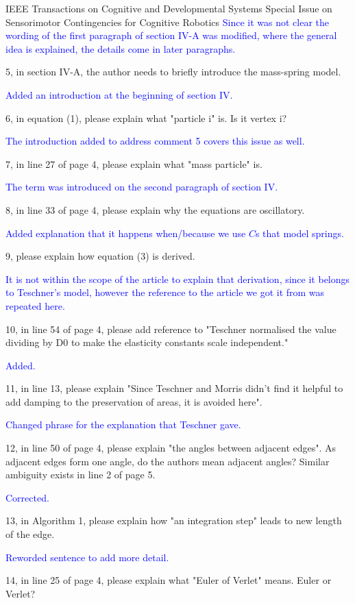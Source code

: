 \documentclass[a4paper,12pt]{letter}
\newcommand{\comment}[1]{\textcolor{blue}{#1}}
\begin{document}
\begin{letter}{IEEE Transactions on Cognitive and Developmental Systems\newline
Special Issue on Sensorimotor Contingencies for Cognitive Robotics}
\comment{Since it was not clear the wording of the first paragraph of section IV-A was modified, where the general idea is explained, the details come in later paragraphs.}

5, in section IV-A, the author needs to briefly introduce the mass-spring model.

\comment{Added an introduction at the beginning of section IV.}

6, in equation (1), please explain what "particle i" is. Is it vertex i? 

\comment{The introduction added to address comment 5 covers this issue as well.}

7, in line 27 of page 4, please explain what "mass particle" is.

\comment{The term was introduced on the second paragraph of section IV.}

8, in line 33 of page 4, please explain why the equations are oscillatory.

\comment{Added explanation that it happens when/because we use $C$s that model springs.}

9, please explain how equation (3) is derived.

\comment{It is not within the scope of the article to explain that derivation, since it belongs to Teschner's model, however the reference to the article we got it from was repeated here.}

10, in line 54 of page 4, please add reference to "Teschner normalised the value dividing by D0 to make the elasticity constants scale independent." 

\comment{Added.}

11, in line 13, please explain "Since Teschner and Morris didn’t find it helpful to add damping to the preservation of areas, it is avoided here".

\comment{Changed phrase for the explanation that Teschner gave.}

12, in line 50 of page 4, please explain "the angles between adjacent edges". As adjacent edges form one angle, do the authors mean adjacent angles? Similar ambiguity exists in line 2 of page 5. 

\comment{Corrected.}

13, in Algorithm 1, please explain how "an integration step" leads to new length of the edge. 

\comment{Reworded sentence to add more detail.}

14, in line 25 of page 4, please explain what "Euler of Verlet" means. Euler or Verlet? 


\end{letter}
\end{document}

